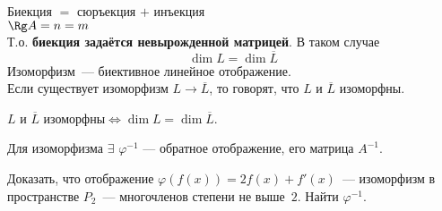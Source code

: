 Биекция $=$ сюръекция $+$ инъекция\\
$\Rg A=n=m$\\
Т.о. \textbf{биекция задаётся невырожденной матрицей}. В таком случае
$$\dim L = \dim \overline L$$
\textsf{Изоморфизм}~--- биективное линейное отображение.\\
Если существует изоморфизм $L \to \overline L$, то говорят, что $L$ и $\overline L$ \textsf{изоморфны}.

\begin{theorem}
$L$ и $\overline L$ изоморфны$\iff \dim L =
\dim \overline L$.
\end{theorem}

Для изоморфизма $\exists$ $\varphi^{-1}$ --- \textsf{обратное отображение}, его матрица $A^{-1}$.

\begin{prim}
Доказать, что отображение $\varphi(f(x)) = 2f(x) + f'(x)$~--- изоморфизм
в пространстве $P_2$~---  многочленов степени не выше~$2$. Найти $\varphi^{-1}$.
\end{prim}\\

